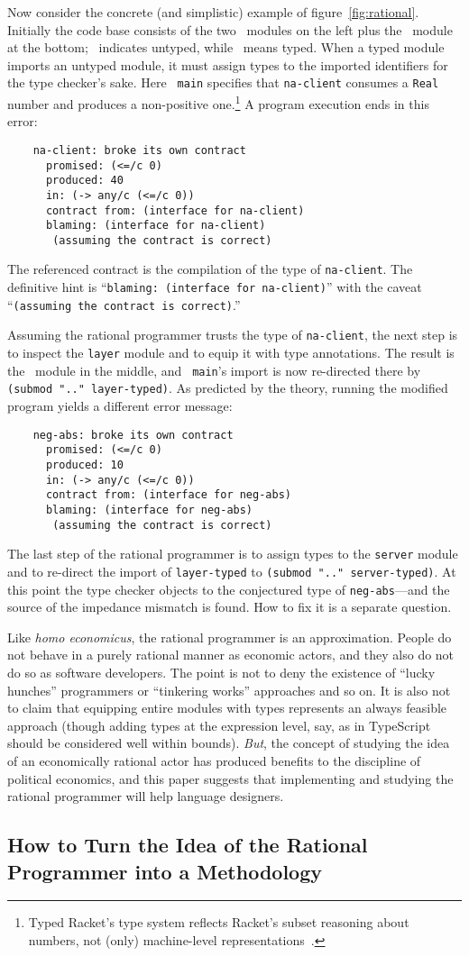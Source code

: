 Now consider the concrete (and simplistic) example of figure~\ref{fig:rational}.
Initially the code base consists of the two \dyncolor\ modules on the left plus
the \typecolor\ module at the bottom; \dyncolor\ indicates untyped, while
\typecolor\ means typed. When a typed module imports an untyped module, it must
assign types to the imported identifiers for the type checker's sake. Here {\tt
main} specifies that {\tt na-client} consumes a {\tt Real} number and produces a
non-positive one.\footnote{Typed Racket's type system reflects Racket's subset
reasoning about numbers, not (only) machine-level
representations~\citep{stathff-padl-12}.} A program execution ends in this error:
\begin{verbatim}
    na-client: broke its own contract
      promised: (<=/c 0)
      produced: 40
      in: (-> any/c (<=/c 0))           
      contract from: (interface for na-client)
      blaming: (interface for na-client)
       (assuming the contract is correct)
\end{verbatim}
The referenced contract is the compilation of the type of {\tt na-client}. The
definitive hint is ``{\tt blaming: (interface for na-client)}'' with the caveat
``{\tt (assuming the contract is correct)}.''

Assuming the rational programmer trusts the type of {\tt na-client}, the next
step is to inspect the {\tt layer} module and to equip it with type
annotations. The result is the \typecolor\ module in the middle, and {\tt
main}'s import is now re-directed there by {\tt (submod ".." layer-typed)}. As
predicted by the theory, running the modified program yields a different error message:
\begin{verbatim}
    neg-abs: broke its own contract
      promised: (<=/c 0)
      produced: 10
      in: (-> any/c (<=/c 0))
      contract from: (interface for neg-abs)
      blaming: (interface for neg-abs)
       (assuming the contract is correct)
\end{verbatim}
The last step of the rational programmer is to assign types to the {\tt server}
module and to re-direct the import of {\tt layer-typed} to {\tt (submod ".."
server-typed)}. At this point the type checker objects to the conjectured type
of {\tt neg-abs}---and the source of the impedance mismatch is found. How to fix
it is a separate question.

Like {\it homo economicus\/}, the rational programmer is an approximation.
People do not behave in a purely rational manner as economic actors, and they
also do not do so as software developers. The point is not to deny the existence
of ``lucky hunches'' programmers or ``tinkering works'' approaches and so on. It
is also not to claim that equipping entire modules with types represents an
always feasible approach (though adding types at the expression level, say, as
in TypeScript should be considered well within bounds).  {\em But\/}, the
concept of studying the idea of an economically rational actor has produced
benefits to the discipline of political economics, and this paper suggests that
implementing and studying the rational programmer will help language designers.

\subsection{How to Turn the Idea of the Rational Programmer into a Methodology} 
\label{sub:methodology}


